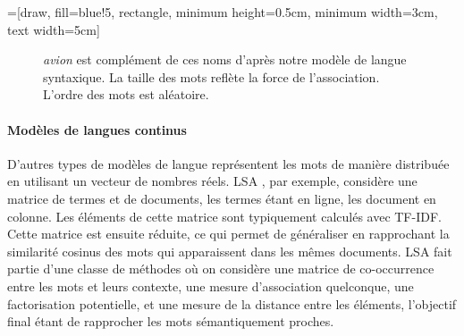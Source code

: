 =[draw, fill=blue!5, rectangle, minimum height=0.5cm, minimum width=3cm, text width=5cm]

\begin{figure}[ht]
  \centering
  \caption{\textit{avion} est complément de ces noms d'après notre modèle de
  langue syntaxique. La taille des mots reflète la force de l'association.
  L'ordre des mots est aléatoire.}
\end{figure}

\paragraph{Modèles de langues continus} D'autres types de modèles de langue
représentent les mots de manière distribuée en utilisant un vecteur de nombres
réels. LSA \citep{deerwester1990indexing}, par exemple, considère une matrice
de termes et de documents, les termes étant en ligne, les document en colonne.
Les éléments de cette matrice sont typiquement calculés avec TF-IDF. Cette
matrice est ensuite réduite, ce qui permet de généraliser en rapprochant la
similarité cosinus des mots qui apparaissent dans les mêmes documents. LSA fait
partie d'une classe de méthodes où on considère une matrice de co-occurrence
entre les mots et leurs contexte, une mesure d'association quelconque, une
factorisation potentielle, et une mesure de la distance entre les éléments,
l'objectif final étant de rapprocher les mots sémantiquement proches.

